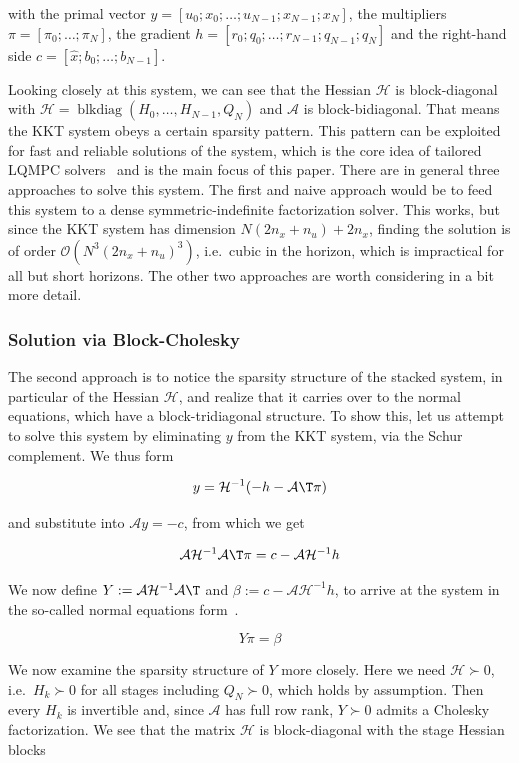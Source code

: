 with the primal vector $y = [u_0; x_0; \dots; u_{N-1}; x_{N-1}; x_N]$, the multipliers $\pi = [\pi_0; \dots; \pi_N]$, the gradient $h = [r_0; q_0; \dots; r_{N-1}; q_{N-1}; q_N]$ and the right-hand side $c = [\hat{x}; b_0; \dots; b_{N-1}]$.

Looking closely at this system, we can see that the Hessian $\mathcal{H}$ is block-diagonal with $\mathcal{H} = \operatorname{blkdiag}(H_0, \dots, H_{N-1}, Q_N)$ and $\mathcal{A}$ is block-bidiagonal.
That means the KKT system obeys a certain sparsity pattern.
This pattern can be exploited for fast and reliable solutions of the system, which is the core idea of tailored LQMPC solvers~\cite{wang2009fast,frison2020hpipm} and is the main focus of this paper.
There are in general three approaches to solve this system.
The first and naive approach would be to feed this system to a dense symmetric-indefinite factorization solver.
This works, but since the KKT system has dimension $N(2n_x + n_u) + 2n_x$, finding the solution is of order $\mathcal{O}\!\left(N^3 (2n_x + n_u)^3\right)$, i.e.\ cubic in the horizon, which is impractical for all but short horizons.
The other two approaches are worth considering in a bit more detail.

\subsubsection{Solution via Block-Cholesky}

The second approach is to notice the sparsity structure of the stacked system, in particular of the Hessian $\mathcal{H}$, and realize that it carries over to the normal equations, which have a block-tridiagonal structure.
To show this, let us attempt to solve this system by eliminating $y$ from the KKT system, via the Schur complement.
We thus form

\[
y = \mathcal{H}^{-1}(-h - \mathcal{A}\T \pi)
\]

and substitute into $\mathcal{A}y = -c$, from which we get

\[
\mathcal{A} \mathcal{H}^{-1} \mathcal{A}\T \pi = c - \mathcal{A} \mathcal{H}^{-1} h
\]

We now define $Y := \mathcal{A} \mathcal{H}^{-1} \mathcal{A}\T$ and $\beta := c - \mathcal{A} \mathcal{H}^{-1} h$, to arrive at the system in the so-called normal equations form~\cite{wang2009fast}.

\[
    Y \pi = \beta
\]

We now examine the sparsity structure of $Y$ more closely.
Here we need $\mathcal{H} \succ 0$, i.e.\ $H_k \succ 0$ for all stages including $Q_N \succ 0$, which holds by assumption.
Then every $H_k$ is invertible and, since $\mathcal{A}$ has full row rank, $Y \succ 0$ admits a Cholesky factorization.
We see that the matrix $\mathcal{H}$ is block-diagonal with the stage Hessian blocks

